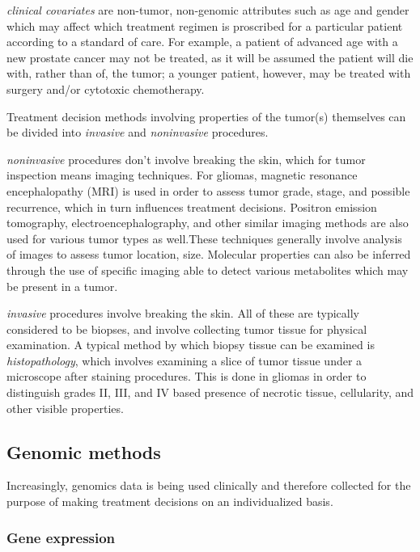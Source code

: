       \textit{clinical covariates} are non-tumor, non-genomic attributes such as age and gender
      which may affect which treatment regimen is proscribed for a
      particular patient according to a standard of care. For example,
      a patient of advanced age with a new prostate cancer may not be
      treated, as it will be assumed the patient will die with, rather
      than of, the tumor; a younger patient, however, may be treated
      with surgery and/or cytotoxic chemotherapy.

      Treatment decision methods involving properties of the tumor(s)
      themselves can be divided into \textit{invasive} and
      \textit{noninvasive} procedures.

      \textit{noninvasive} procedures don't involve breaking the skin,
      which for tumor inspection means imaging techniques. For
      gliomas, magnetic resonance encephalopathy (MRI) is used in
      order to assess tumor grade, stage, and possible recurrence, which in turn influences
      treatment decisions. Positron emission tomography,
      electroencephalography, and other similar imaging methods are
      also used for various tumor types as well.These techniques
      generally involve analysis of images to assess tumor location,
      size. Molecular properties can also be inferred through the use
      of specific imaging able to detect various metabolites which may
      be present in a tumor. 

      \textit{invasive} procedures involve breaking the skin. All of
      these are typically considered to be biopses, and involve
      collecting tumor tissue for physical examination. A typical
      method by which biopsy tissue can be examined is
      \textit{histopathology}, which
      involves examining a slice of tumor tissue under a microscope
      after staining procedures. This is done in gliomas in order to
      distinguish grades II, III, and IV based presence of necrotic
      tissue, cellularity, and other visible properties.

      \subsection{Genomic methods}

      Increasingly, genomics data is being used clinically and
      therefore collected for the purpose of making treatment
      decisions on an individualized basis.

      \subsubsection{Gene expression}


